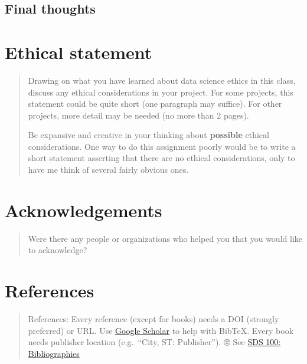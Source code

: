 \documentclass[
  letterpaper,
  DIV=11,
  numbers=noendperiod]{scrartcl}
\begin{document}
\subsection{Final thoughts}\label{final-thoughts}

\section{Ethical statement}\label{ethical-statement}

\begin{quote}
Drawing on what you have learned about data science ethics in this
class, discuss any ethical considerations in your project. For some
projects, this statement could be quite short (one paragraph may
suffice). For other projects, more detail may be needed (no more than 2
pages).

Be expansive and creative in your thinking about \textbf{possible}
ethical considerations. One way to do this assignment poorly would be to
write a short statement asserting that there are no ethical
considerations, only to have me think of several fairly obvious ones.
\end{quote}

\section{Acknowledgements}\label{acknowledgements}

\begin{quote}
Were there any people or organizations who helped you that you would
like to acknowledge?
\end{quote}

\section*{References}\label{references}

\begin{quote}
References: Every reference (except for books) needs a DOI (strongly
preferred) or URL. Use \href{https://scholar.google.com}{Google Scholar}
to help with BibTeX. Every book needs publisher location (e.g.~``City,
ST: Publisher''). 🙄 See
\href{https://smithcollege-sds.github.io/sds100/lab_12_bibliographies.html}{SDS
100: Bibliographies}
\end{quote}
\end{document}
